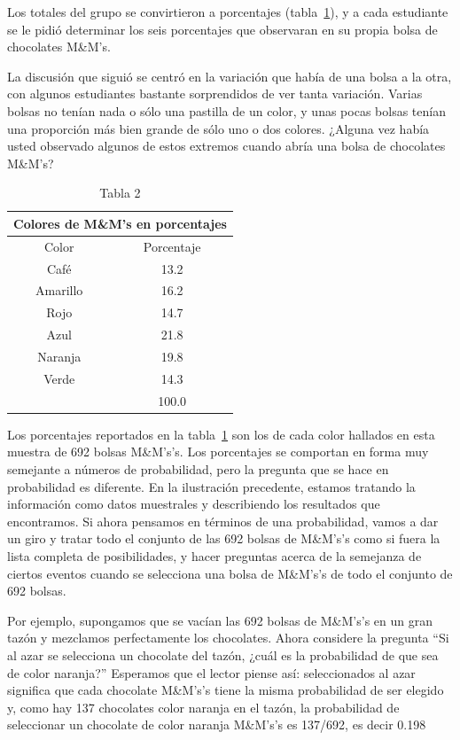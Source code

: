 \documentclass[10pt,twoside]{article}
\begin{document}
Los totales del grupo se convirtieron a porcentajes (tabla~\ref{tab2}), y a cada estudiante se le pidió determinar los seis porcentajes que observaran en su propia bolsa de chocolates M\&M's.

La discusión que siguió se centró en la variación que había de una bolsa a la
otra, con algunos estudiantes bastante sorprendidos de ver tanta variación. Varias
bolsas no tenían nada o sólo una pastilla de un color, y unas pocas bolsas tenían una
proporción más bien grande de sólo uno o dos colores. ¿Alguna vez había usted observado algunos de estos extremos cuando abría una bolsa de chocolates M\&M's?
\begin{table}[h!]
\centering
\begin{tabular}{cc}
\multicolumn{2}{c}{Colores de M\&M's en porcentajes} \\ 
\hline 
Color & Porcentaje \\ 
\hline 
Café & 13.2 \\ 
Amarillo & 16.2 \\ 
Rojo & 14.7 \\ 
Azul & 21.8 \\ 
Naranja & 19.8 \\ 
Verde & 14.3 \\ \cline{2-2} 
 & 100.0 \\ 
\hline 
\end{tabular} 
\caption{Tabla 2} \label{tab2}
\end{table}

Los porcentajes reportados en la tabla~\ref{tab2} son los de cada color hallados en esta
muestra de 692 bolsas M\&M's’s. Los porcentajes se comportan en forma muy semejante a números de probabilidad, pero la pregunta que se hace en probabilidad es diferente. En la ilustración precedente, estamos tratando la información como datos muestrales y describiendo los resultados que encontramos. Si ahora pensamos
en términos de una probabilidad, vamos a dar un giro y tratar todo el conjunto de
las 692 bolsas de M\&M's’s como si fuera la lista completa de posibilidades, y hacer
preguntas acerca de la semejanza de ciertos eventos cuando se selecciona una bolsa
de M\&M's’s de todo el conjunto de 692 bolsas.

Por ejemplo, supongamos que se vacían las 692 bolsas de M\&M's’s en un gran
tazón y mezclamos perfectamente los chocolates. Ahora considere la pregunta “Si
al azar se selecciona un chocolate del tazón, ¿cuál es la probabilidad de que sea de
color naranja?” Esperamos que el lector piense así: seleccionados al azar significa
que cada chocolate M\&M's’s tiene la misma probabilidad de ser elegido y, como hay
137 chocolates color naranja en el tazón, la probabilidad de seleccionar un chocolate de color naranja M\&M's’s es 137/692, es decir 0.198
\end{document}

